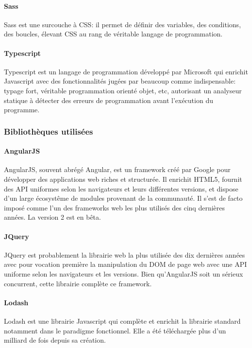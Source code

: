 \documentclass[a4paper,french,12pt]{article}
\begin{document}
			\paragraph{Sass}
			Sass est une surcouche à CSS: il permet de définir des variables, des conditions, des boucles, élevant CSS au rang de véritable langage de programmation.
			
			\paragraph{Typescript} 
			Typescript est un langage de programmation développé par Microsoft qui enrichit Javascript avec des fonctionnalités jugées par beaucoup comme indispensable: typage fort, véritable programmation orienté objet, etc, autorisant un analyseur statique à détecter des erreurs de programmation avant l'exécution du programme.

		\subsubsection{Bibliothèques utilisées}

		  \paragraph{AngularJS}
		  	AngularJS, souvent abrégé Angular, est un framework créé par Google pour développer des applications web riches et structurée.
		  	Il enrichit HTML5, fournit des API uniformes selon les navigateurs et leurs différentes versions, et dispose d'un large écosystême de modules provenant de la communauté.
		  	Il s'est de facto imposé comme l'un des frameworks web les plus utilisés des cinq dernières années. La version 2 est en bêta.

		\paragraph{JQuery}
		JQuery est probablement la librairie web la plus utilisée des dix dernières années avec pour vocation première la manipulation du DOM de page web avec une API uniforme selon les navigateurs et les versions. Bien qu'AngularJS soit un sérieux concurrent, cette librairie complète ce framework.
		  	
		  \paragraph{Lodash}
		  Lodash est une librairie Javascript qui complète et enrichit la librairie standard notamment dans le paradigme fonctionnel.
		  Elle a été téléchargée plus d'un milliard de fois depuis sa création.
		  
\end{document}
